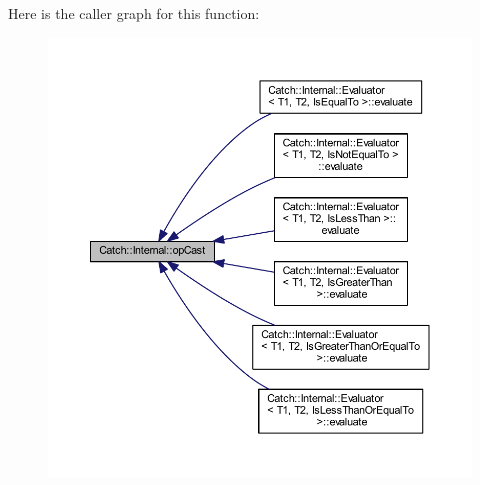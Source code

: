 Here is the caller graph for this function\+:\nopagebreak
\begin{figure}[H]
\begin{center}
\leavevmode
\includegraphics[width=350pt]{namespace_catch_1_1_internal_adde98c1a650e94615e2b37ab0b3734e2_icgraph}
\end{center}
\end{figure}
